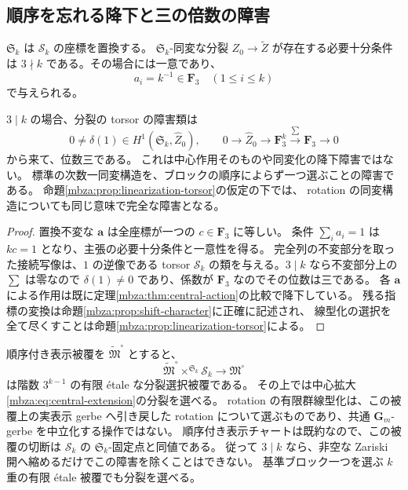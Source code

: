 \subsection{順序を忘れる降下と三の倍数の障害}

\begin{corollary}[置換不変な分裂の必要十分条件]
\label{mbza:cor:permutation-obstruction}
$\mathfrak S_k$ は $\mathscr S_k$ の座標を置換する。
$\mathfrak S_k$-同変な分裂 $Z_0\to\widetilde Z$ が存在する必要十分条件は
$3\nmid k$ である。その場合には一意であり、
\begin{equation}\label{mbza:eq:symmetric-splitting}
 a_i=k^{-1}\in\mathbf F_3\quad(1\le i\le k)
\end{equation}
で与えられる。

$3\mid k$ の場合、分裂の torsor の障害類は
\begin{equation}\label{mbza:eq:splitting-obstruction}
 0\ne\delta(1)\in H^1(\mathfrak S_k,\widehat Z_0),
 \qquad
 0\longrightarrow\widehat Z_0\longrightarrow\mathbf F_3^k
     \xrightarrow{\sum}\mathbf F_3\longrightarrow0
\end{equation}
から来て、位数三である。
これは中心作用そのものや同変化の降下障害ではない。
標準の次数一同変構造を、ブロックの順序によらず一つ選ぶことの障害である。
命題\ref{mbza:prop:linearization-torsor}の仮定の下では、
rotation の同変構造についても同じ意味で完全な障害となる。
\end{corollary}
\begin{proof}
置換不変な $\boldsymbol a$ は全座標が一つの $c\in\mathbf F_3$ に等しい。
条件 $\sum_i a_i=1$ は $kc=1$ となり、主張の必要十分条件と一意性を得る。
完全列の不変部分を取った接続写像は、$1$ の逆像である torsor
$\mathscr S_k$ の類を与える。$3\mid k$ なら不変部分上の $\sum$ は零なので
$\delta(1)\ne0$ であり、係数が $\mathbf F_3$ なのでその位数は三である。
各 $\boldsymbol a$ による作用は既に定理\ref{mbza:thm:central-action}の比較で降下している。
残る指標の変換は命題\ref{mbza:prop:shift-character}に正確に記述され、
線型化の選択を全て尽くすことは命題\ref{mbza:prop:linearization-torsor}による。
\end{proof}

順序付き表示被覆を $\widetilde{\mathfrak M}^{\circ}$ とすると、
\begin{equation}\label{mbza:eq:splitting-cover}
 \widetilde{\mathfrak M}^{\circ}
       \times^{\mathfrak S_k}\mathscr S_k
       \longrightarrow\mathfrak M^{\circ}
\end{equation}
は階数 $3^{k-1}$ の有限 \'etale な分裂選択被覆である。
その上では中心拡大\eqref{mbza:eq:central-extension}の分裂を選べる。
rotation の有限群線型化は、この被覆上の実表示 gerbe へ引き戻した
rotation について選ぶものであり、共通 $\mathbf G_m$-gerbe を中立化する操作ではない。
順序付き表示チャートは既約なので、この被覆の切断は
$\mathscr S_k$ の $\mathfrak S_k$-固定点と同値である。
従って $3\mid k$ なら、非空な Zariski 開へ縮めるだけでこの障害を除くことはできない。
基準ブロック一つを選ぶ $k$ 重の有限 \'etale 被覆でも分裂を選べる。

